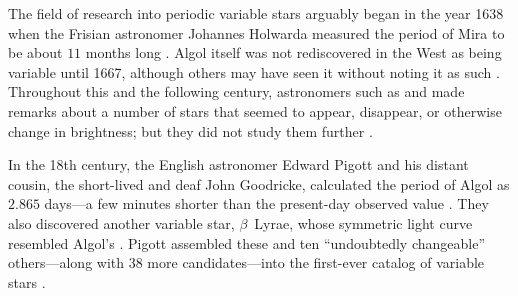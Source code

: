 The field of research into periodic variable stars arguably began in the year 1638 when the Frisian astronomer Johannes Holwarda measured the period of Mira to be about $11$ months long \citep[e.g.,][]{1997JAVSO..25..115H}. 
Algol itself was not rediscovered in the West as being variable until 1667, although others may have seen it without noting it as such \citep[e.g.,][]{bolt2007biographical}. 
Throughout this and the following century, astronomers such as \citet{10.2307/101080} and \citet{flamsteed} made remarks about a number of stars that seemed to appear, disappear, or otherwise change in brightness; but they did not study them further \citep[e.g.,][]{10.2307/106621}. 

\iffalse
\begin{figure}
    \centering
    \frame{\texttt{[image: pics/mira2.png]}}
    \caption[A picture of Mira the Wonderful]{Mira, observed in the ultraviolet by the NASA space telescope \emph{Galaxy Evolution Explorer} (\textsc{GALEX}, 2006). An evolved star, Mira drives a strong stellar wind; its shedded mass appears as a tail spanning $13$ lightyears. 
    \label{fig:mira}}
\end{figure}
\fi

In the 18th century, the English astronomer Edward Pigott and his distant cousin, the short-lived and deaf John Goodricke, calculated the period of Algol as $2.865$ days---a few minutes shorter than the present-day observed value \citep{10.2307/106502,10.2307/106591,2012ApJ...752...20B}. 
They also discovered another variable star, $\beta$~Lyrae, whose symmetric light curve resembled Algol's \citep{1785RSPT...75..127P}. 
Pigott assembled these and ten ``undoubtedly changeable'' others---along with $38$ more candidates---into the first-ever catalog of variable stars \citep{10.2307/106621}. 

